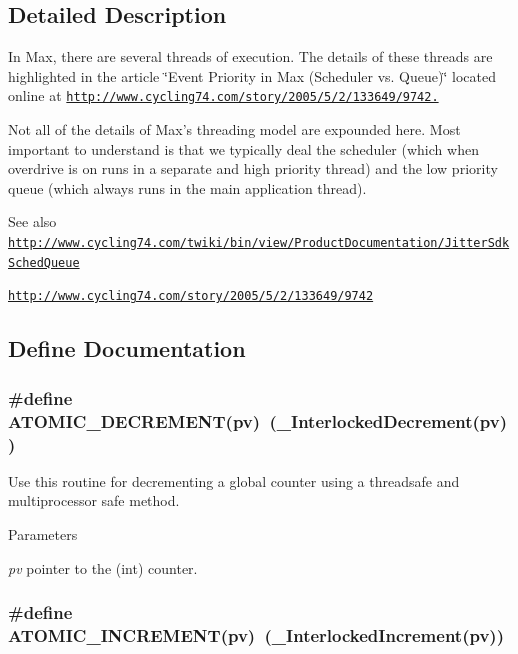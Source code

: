 \subsection{Detailed Description}
In Max, there are several threads of execution. The details of these threads are highlighted in the article \char`\"{}Event Priority in Max (Scheduler vs. Queue)\char`\"{} located online at \href{http://www.cycling74.com/story/2005/5/2/133649/9742.}{\tt http://www.cycling74.com/story/2005/5/2/133649/9742.}

Not all of the details of Max's threading model are expounded here. Most important to understand is that we typically deal the scheduler (which when overdrive is on runs in a separate and high priority thread) and the low priority queue (which always runs in the main application thread).

\begin{DoxySeeAlso}{See also}
\href{http://www.cycling74.com/twiki/bin/view/ProductDocumentation/JitterSdkSchedQueue}{\tt http://www.cycling74.com/twiki/bin/view/ProductDocumentation/JitterSdkSchedQueue} 

\href{http://www.cycling74.com/story/2005/5/2/133649/9742}{\tt http://www.cycling74.com/story/2005/5/2/133649/9742} 
\end{DoxySeeAlso}


\subsection{Define Documentation}
\hypertarget{group__threading_gaa42a5aadef70fe57dc80d247c890c9ac}{
\subsubsection[{ATOMIC\_\-DECREMENT}]{\setlength{\rightskip}{0pt plus 5cm}\#define ATOMIC\_\-DECREMENT(pv)~(\_\-InterlockedDecrement(pv))}}
\label{group__threading_gaa42a5aadef70fe57dc80d247c890c9ac}


Use this routine for decrementing a global counter using a threadsafe and multiprocessor safe method. 
\begin{DoxyParams}{Parameters}
\item[{\em pv}]pointer to the (int) counter. \end{DoxyParams}
\hypertarget{group__threading_ga411e2e07982bdfb1803b415a350e311a}{
\subsubsection[{ATOMIC\_\-INCREMENT}]{\setlength{\rightskip}{0pt plus 5cm}\#define ATOMIC\_\-INCREMENT(pv)~(\_\-InterlockedIncrement(pv))}}
\label{group__threading_ga411e2e07982bdfb1803b415a350e311a}


